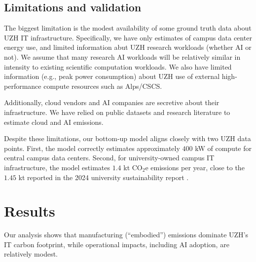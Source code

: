\documentclass[11pt]{article}
\begin{document}
\subsection{Limitations and validation}

The biggest limitation is the modest availability of some ground truth data about UZH IT infrastructure. Specifically, we have only estimates of campus data center energy use, and limited information abut UZH research workloads (whether AI or not). We assume that many research AI workloads will be relatively similar in intensity to existing scientific computation workloads. We also have limited information (e.g., peak power consumption) about UZH use of external high-performance compute resources such as Alps/CSCS.

Additionally, cloud vendors and AI companies are secretive about their infrastructure. We have relied on public datasets and research literature to estimate cloud and AI emissions.

Despite these limitations, our bottom-up model aligns closely with two UZH data points. First, the model correctly estimates approximately $400$ kW of compute for central campus data centers. Second, for university-owned campus IT infrastructure, the model estimates $1.4$ kt CO$_2$e emissions per year, close to the $1.45$ kt reported in the 2024 university sustainability report \cite{uzh:sustainability:report}.

\section{Results}
\label{sec:results}

Our analysis shows that manufacturing (“embodied”) emissions dominate UZH's IT carbon footprint, while operational impacts, including AI adoption, are relatively modest.
\end{document}
